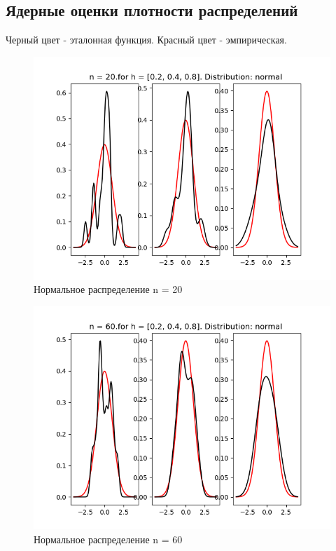 \documentclass[a4]{article}
\begin{document}
		\subsection{Ядерные оценки плотности распределений}
		Черный цвет - эталонная функция. Красный цвет - эмпирическая.
		\begin{center}
			\begin{figure}[h!]
				\includegraphics[width=\textwidth]{normalker20.png} 
				\caption[Нормальное распределение n = 20]{Нормальное распределение n = 20}
			\end{figure}
			\newpage
			\begin{figure}[h!]
				\includegraphics[width=\textwidth]{normalker60.png} 
				\caption[Нормальное распределение n = 60]{Нормальное распределение n = 60}

\end{figure}
\end{center}
\end{document}
